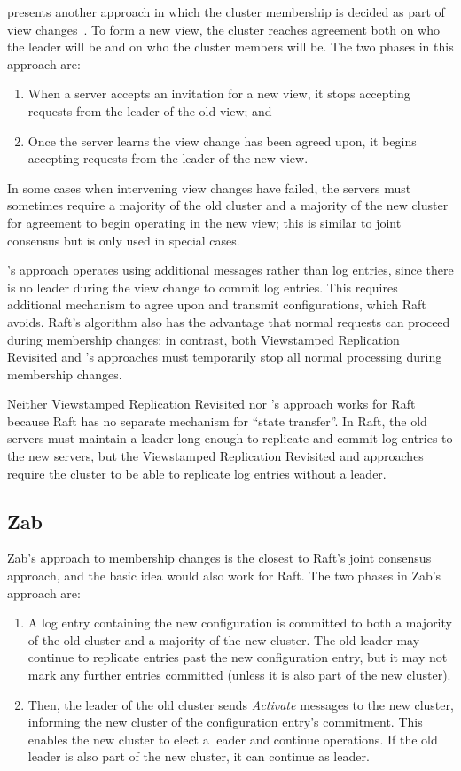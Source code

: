\mazieres{} presents another approach in which the cluster membership is
decided as part of view changes~\cite{Mazieres:2007}.
To form a new view, the cluster reaches agreement both on who the leader
will be and on who the cluster members will be. The two phases in this
approach are:
%
\begin{enumerate}
%
\item When a server accepts an invitation for a new view, it stops
accepting requests from the leader of the old view; and
%
\item Once the server learns the view change has been agreed upon, it
begins accepting requests from the leader of the new view.
%
\end{enumerate}
%
In some cases when intervening view changes have failed, the servers
must sometimes require a majority of the old cluster and a majority of
the new cluster for agreement to begin operating in the new view; this
is similar to joint consensus but is only used in special cases.

\mazieres{}'s approach operates using additional messages rather than
log entries, since there is no leader during the view change to commit
log entries. This requires additional mechanism to agree upon and
transmit configurations, which Raft avoids. Raft's algorithm also has
the advantage that normal requests can proceed during membership
changes; in contrast, both Viewstamped Replication Revisited and
\mazieres{}'s approaches must temporarily stop all normal processing
during membership changes.

Neither Viewstamped Replication
Revisited nor \mazieres{}'s approach works for Raft because Raft has no
separate mechanism for ``state transfer''. In Raft, the old servers must
maintain a leader long enough to replicate and commit log entries to the
new servers, but the Viewstamped Replication Revisited and \mazieres{}
approaches require the cluster to be able to
replicate log entries without a leader.

\subsection{Zab}

Zab's approach to membership changes is the closest to Raft's joint
consensus approach, and the basic idea would also work for Raft.
The two phases in Zab's approach are:
%
\begin{enumerate}
%
\item A log entry containing the new configuration is committed to both
a majority of the old cluster and a majority of the new
cluster. The old
leader may continue to replicate entries past the new configuration
entry, but it may not mark any further entries committed (unless it is
also part of the new cluster).
%
\item Then,
the leader of the old cluster sends \emph{Activate}
messages to the new cluster, informing the new cluster of the
configuration entry's
commitment. This enables the new cluster to elect a
leader and continue operations. If the old leader is also part of the
new cluster, it can continue as leader.
%
\end{enumerate}

